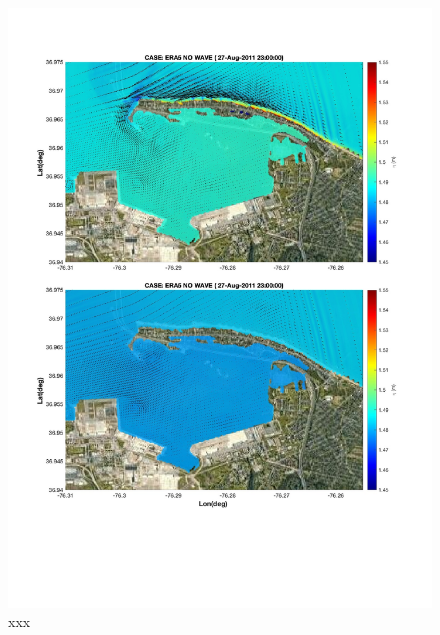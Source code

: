 \documentclass[preprint,12pt,authoryear]{elsarticle}
\begin{document}
\begin{figure}
\centering
\includegraphics[width=\textwidth]{./figures/nearcom_wo_wave.pdf}
\caption{xxx }
\label{boundary}
\centering
\end{figure}
\end{document}
